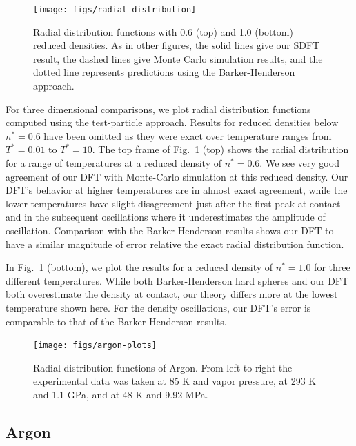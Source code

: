 \documentclass[letterpaper,twocolumn,amsmath,amssymb,prb]{revtex4-1}
\begin{document}
\begin{figure}
\begin{center}
  \texttt{[image: figs/radial-distribution]}
\end{center}
\caption{Radial distribution functions with 0.6 (top) and 1.0 (bottom)
  reduced densities. As in other figures, the solid lines give our
  SDFT result, the dashed lines give Monte Carlo simulation results,
  and the dotted line represents predictions using the
  Barker-Henderson approach.}
\label{fig:radial-distribution}
\end{figure}

For three dimensional comparisons, we plot radial distribution
functions computed using the test-particle approach.  Results for
reduced densities below $n^* = 0.6$ have been
omitted as they were exact over temperature ranges from $T^*=0.01$ to
$T^*=10$. The top frame of Fig.~\ref{fig:radial-distribution} (top) shows
the radial distribution for a range of temperatures at a reduced
density of $n^* = 0.6$. We see very good agreement of our DFT with
Monte-Carlo simulation at this reduced density. Our DFT's behavior at
higher temperatures are in almost exact agreement, while the lower
temperatures have slight disagreement just after the first peak at
contact and in the subsequent oscillations where it underestimates the
amplitude of oscillation. Comparison with the Barker-Henderson results
shows our DFT to have a similar magnitude of error relative the exact
radial distribution function.

In Fig.~\ref{fig:radial-distribution} (bottom), we plot the results
for a reduced density of $n^*=1.0$ for three different
temperatures. While both Barker-Henderson hard spheres and our DFT
both overestimate the density at contact, our theory differs more at
the lowest temperature shown here. For the density oscillations, our
DFT's error is comparable to that of the Barker-Henderson results.

\begin{figure}
  \begin{center}
    \texttt{[image: figs/argon-plots]}
  \end{center}
  \caption{Radial distribution functions of Argon. From left to right
    the experimental data was taken at 85 K and vapor pressure, at 293
    K and 1.1 GPa, and at 48 K and 9.92 MPa.}
  \label{fig:argon-plots}
\end{figure}

\subsection{Argon}
\end{document}

